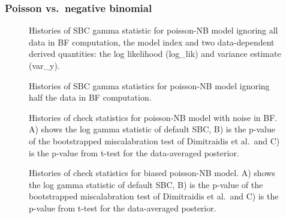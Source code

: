 \documentclass[
  letterpaper,
  DIV=11,
  numbers=noendperiod]{scrartcl}
\begin{document}
\subsubsection{Poisson vs.~negative
binomial}\label{poisson-vs.-negative-binomial}

\begin{figure}


\caption{\label{fig-pnb-ignore-all}Histories of SBC gamma statistic for
poisson-NB model ignoring all data in BF computation, the model index
and two data-dependent derived quantities: the log likelihood (log\_lik)
and variance estimate (var\_y).}

\end{figure}%

\begin{figure}


\caption{\label{fig-pnb-ignore-half}Histories of SBC gamma statistics
for poisson-NB model ignoring half the data in BF computation.}

\end{figure}%

\begin{figure}


\caption{\label{fig-pnb-noise}Histories of check statistics for
poisson-NB model with noise in BF. A) shows the log gamma statistic of
default SBC, B) is the p-value of the bootstrapped miscalabration test
of Dimitraidis et al.~and C) is the p-value from t-test for the
data-averaged posterior.}

\end{figure}%

\begin{figure}


\caption{\label{fig-pnb-bias}Histories of check statistics for biased
poisson-NB model. A) shows the log gamma statistic of default SBC, B) is
the p-value of the bootstrapped miscalabration test of Dimitraidis et
al.~and C) is the p-value from t-test for the data-averaged posterior.}

\end{figure}%
\end{document}
